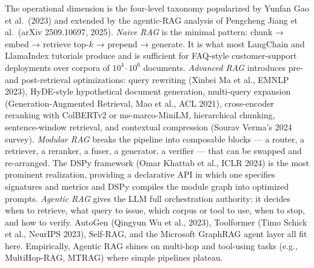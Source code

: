 \documentclass{article}
\begin{document}
The operational dimension is the four-level taxonomy popularized by Yunfan Gao et al.~(2023) and extended by the agentic-RAG analysis of Pengcheng Jiang et al.~(arXiv 2509.10697, 2025). \emph{Naive RAG} is the minimal pattern: chunk → embed → retrieve top-\(k\) → prepend → generate. It is what most LangChain and LlamaIndex tutorials produce and is sufficient for FAQ-style customer-support deployments over corpora of \(10^4\)--\(10^6\) documents. \emph{Advanced RAG} introduces pre- and post-retrieval optimizations: query rewriting (Xinbei Ma et al., EMNLP 2023), HyDE-style hypothetical document generation, multi-query expansion (Generation-Augmented Retrieval, Mao et al., ACL 2021), cross-encoder reranking with ColBERTv2 or ms-marco-MiniLM, hierarchical chunking, sentence-window retrieval, and contextual compression (Sourav Verma's 2024 survey). \emph{Modular RAG} breaks the pipeline into composable blocks --- a router, a retriever, a reranker, a fuser, a generator, a verifier --- that can be swapped and re-arranged. The DSPy framework (Omar Khattab et al., ICLR 2024) is the most prominent realization, providing a declarative API in which one specifies signatures and metrics and DSPy compiles the module graph into optimized prompts. \emph{Agentic RAG} gives the LLM full orchestration authority: it decides when to retrieve, what query to issue, which corpus or tool to use, when to stop, and how to verify. AutoGen (Qingyun Wu et al., 2023), Toolformer (Timo Schick et al., NeurIPS 2023), Self-RAG, and the Microsoft GraphRAG agent layer all fit here. Empirically, Agentic RAG shines on multi-hop and tool-using tasks (e.g., MultiHop-RAG, MTRAG) where simple pipelines plateau.
\end{document}

